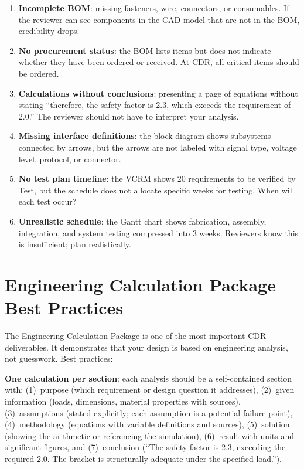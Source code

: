\begin{enumerate}[nosep,leftmargin=1.5em]
\item \textbf{Incomplete BOM}: missing fasteners, wire, connectors, or consumables. If the reviewer can see components in the CAD model that are not in the BOM, credibility drops.
\item \textbf{No procurement status}: the BOM lists items but does not indicate whether they have been ordered or received. At CDR, all critical items should be ordered.
\item \textbf{Calculations without conclusions}: presenting a page of equations without stating ``therefore, the safety factor is 2.3, which exceeds the requirement of 2.0.'' The reviewer should not have to interpret your analysis.
\item \textbf{Missing interface definitions}: the block diagram shows subsystems connected by arrows, but the arrows are not labeled with signal type, voltage level, protocol, or connector.
\item \textbf{No test plan timeline}: the VCRM shows 20 requirements to be verified by Test, but the schedule does not allocate specific weeks for testing. When will each test occur?
\item \textbf{Unrealistic schedule}: the Gantt chart shows fabrication, assembly, integration, and system testing compressed into 3 weeks. Reviewers know this is insufficient; plan realistically.
\end{enumerate}



\section{Engineering Calculation Package Best Practices}
The Engineering Calculation Package is one of the most important CDR deliverables. It demonstrates that your design is based on engineering analysis, not guesswork. Best practices:

\textbf{One calculation per section}: each analysis should be a self-contained section with: (1)~purpose (which requirement or design question it addresses), (2)~given information (loads, dimensions, material properties with sources), (3)~assumptions (stated explicitly; each assumption is a potential failure point), (4)~methodology (equations with variable definitions and sources), (5)~solution (showing the arithmetic or referencing the simulation), (6)~result with units and significant figures, and (7)~conclusion (``The safety factor is 2.3, exceeding the required 2.0. The bracket is structurally adequate under the specified load.'').

